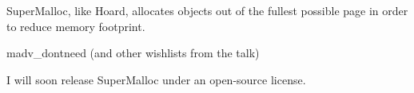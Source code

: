\documentclass[pldi]{sigplanconf-pldi15}
\begin{document}



SuperMalloc, like Hoard, allocates objects out of the fullest possible page in order to reduce memory footprint.

madv\_dontneed (and other wishlists from the talk)

I will soon release SuperMalloc under an open-source license.

{\raggedright


}

\end{document}

